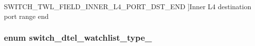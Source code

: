 \begin{Desc}
\begin{description}
{\hypertarget{group__DTel_ggac1ac564283da72d8f9315c73246d73a7a748a2b18c4ca2a26b4f7a1bea0f67212}{S\+W\+I\+T\+C\+H\+\_\+\+T\+W\+L\+\_\+\+F\+I\+E\+L\+D\+\_\+\+I\+N\+N\+E\+R\+\_\+\+L4\+\_\+\+P\+O\+R\+T\+\_\+\+D\+S\+T\+\_\+\+E\+N\+D}\label{group__DTel_ggac1ac564283da72d8f9315c73246d73a7a748a2b18c4ca2a26b4f7a1bea0f67212}
}]Inner L4 destination port range end \end{description}
\end{Desc}
\hypertarget{group__DTel_ga2aef2de534e989fcfd03b3afede795f7}{
\subsubsection[{switch\+\_\+dtel\+\_\+watchlist\+\_\+type\+\_\+}]{\setlength{\rightskip}{0pt plus 5cm}enum {\bf switch\+\_\+dtel\+\_\+watchlist\+\_\+type\+\_\+}}}\label{group__DTel_ga2aef2de534e989fcfd03b3afede795f7}
